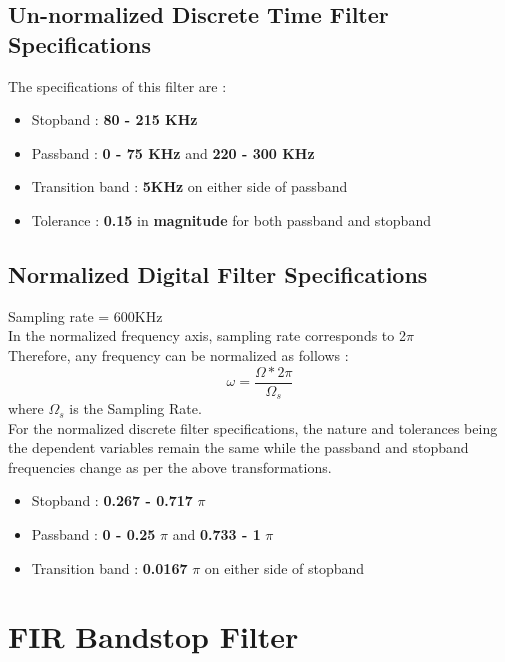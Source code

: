 \documentclass{article}
\begin{document}
\subsection{\textbf{Un-normalized Discrete Time Filter Specifications}}

\vspace{1.5em}
\noindent
The specifications of this filter are :
\begin{itemize}
    \item Stopband : \textbf{80 - 215 KHz}
    \item Passband : \textbf{0 - 75 KHz} and \textbf{220 - 300 KHz}
    \item  Transition band : \textbf{5KHz} on either side of passband
    \item  Tolerance : \textbf{0.15} in \textbf{magnitude} for both passband and stopband
\end{itemize}

\subsection{Normalized Digital Filter Specifications}
Sampling rate = 600KHz\\
In the normalized frequency axis, sampling rate corresponds to 2$\pi$\\
Therefore, any frequency can be normalized as follows :
\begin{equation*}
    \omega = \frac{\Omega*2\pi}{\Omega_s}
\end{equation*}
where $\Omega_s$ is the Sampling Rate.\\

\vspace{1em}
\noindent
For the normalized discrete filter specifications, the nature and tolerances being the dependent variables remain the same while the passband and stopband frequencies change as per the above transformations. 
\begin{itemize}
    \item Stopband : \textbf{0.267 - 0.717} {$\pi$}
    \item Passband : \textbf{0 -  0.25} {$\pi$} and \textbf{0.733 - 1} {$\pi$}
    \item  Transition band : \textbf{0.0167} $\pi$ on either side of stopband
\end{itemize}

\section{FIR Bandstop Filter}
\end{document}
